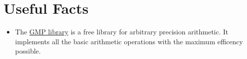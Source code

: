 \documentclass[12pt, a4paper, english]{report}
\begin{document}
\chapter*{Useful Facts}
\begin{itemize}
    \item The \href{https://gmplib.org/}{GMP library} is a free library for arbitrary precision arithmetic. It implements all the basic arithmetic operations with the maximum efficency possible.
\end{itemize}

\listofalgorithms
\listoftheorems[ignoreall, show={theorem}]

\begingroup               %
  \let\clearpage\relax    %
  \renewcommand{\listtheoremname}{List of Lemmas}
  \listoftheorems[ignoreall, show={lemma}]
\endgroup
\end{document}
